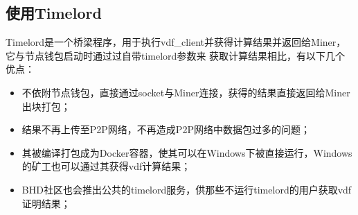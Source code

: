 \subsection{使用Timelord}
\begin{flushleft}
    Timelord是一个桥梁程序，用于执行vdf\_client并获得计算结果并返回给Miner，它与节点钱包启动时通过过自带timelord参数来
    获取计算结果相比，有以下几个优点：
\end{flushleft}
\begin{itemize}
    \item 不依附节点钱包，直接通过socket与Miner连接，获得的结果直接返回给Miner出块打包；
    \item 结果不再上传至P2P网络，不再造成P2P网络中数据包过多的问题；
    \item 其被编译打包成为Docker容器，使其可以在Windows下被直接运行，Windows的矿工也可以通过其获得vdf计算结果；
    \item BHD社区也会推出公共的timelord服务，供那些不运行timelord的用户获取vdf证明结果；
\end{itemize}

